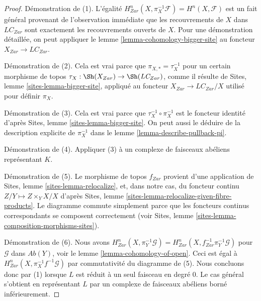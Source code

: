 \begin{proof}
Démonstration de (1).
L'égalité $H^n_{Zar}(X, \pi_X^{-1}\mathcal{F}) = H^n(X, \mathcal{F})$
est un fait général provenant de l'observation immédiate que les recouvrements
de $X$ dans $\textit{LC}_{Zar}$ sont exactement les recouvrements ouverts de
$X$. Pour une démonstration détaillée, on peut appliquer le
lemme \ref{lemma-cohomology-bigger-site} au foncteur
$X_{Zar} \to \textit{LC}_{Zar}$.

\medskip\noindent
Démonstration de (2). Cela est vrai parce que
$\pi_{X, *} = \tau_X^{-1}$ pour un certain morphisme de topos
$\tau_X : \Sh(X_{Zar}) \to \Sh(\textit{LC}_{Zar})$, comme il résulte de
Sites, lemme \ref{sites-lemma-bigger-site}, appliqué au foncteur
$X_{Zar} \to \textit{LC}_{Zar}/X$ utilisé pour définir $\pi_X$.

\medskip\noindent
Démonstration de (3). Cela est vrai parce que
$\tau_X^{-1} \circ \pi_X^{-1}$ est le foncteur identité d'après Sites,
lemme \ref{sites-lemma-bigger-site}. On peut aussi le déduire de la
description explicite de $\pi_X^{-1}$ dans le
lemme \ref{lemma-describe-pullback-pi}.

\medskip\noindent
Démonstration de (4). Appliquer (3) à un complexe de faisceaux abéliens
représentant $K$.

\medskip\noindent
Démonstration de (5). Le morphisme de topos $f_{Zar}$ provient d'une
application de Sites, lemme \ref{sites-lemma-relocalize}, et, dans notre cas,
du foncteur continu
$Z/Y \mapsto Z \times_Y X/X$ d'après Sites, lemme
\ref{sites-lemma-relocalize-given-fibre-products}.
Le diagramme commute simplement parce que les foncteurs continus
correspondants se composent correctement
(voir Sites, lemme \ref{sites-lemma-composition-morphisms-sites}).

\medskip\noindent
Démonstration de (6). Nous avons
$H^n_{Zar}(X, \pi_Y^{-1}\mathcal{G}) =
H^n_{Zar}(X, f_{Zar}^{-1}\pi_Y^{-1}\mathcal{G})$
pour $\mathcal{G}$ dans $\textit{Ab}(Y)$, voir le
lemme \ref{lemma-cohomology-of-open}. Ceci est égal à
$H^n_{Zar}(X, \pi_X^{-1}f^{-1}\mathcal{G})$ par commutativité du diagramme de
(5). Nous concluons donc par (1) lorsque $L$ est réduit à un seul faisceau en
degré $0$. Le cas général s'obtient en représentant $L$ par un complexe de
faisceaux abéliens borné inférieurement.


\end{proof}
